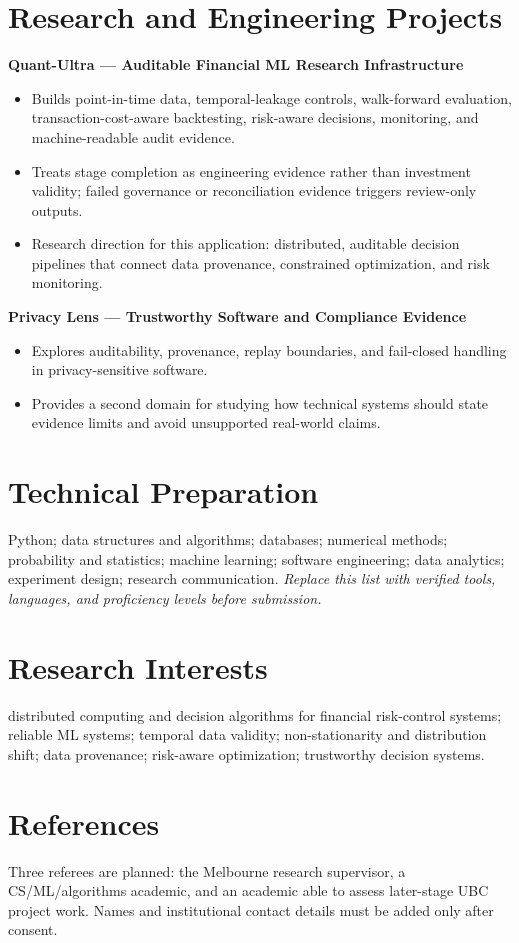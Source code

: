 \documentclass[11pt]{article}
\begin{document}
\section*{Research and Engineering Projects}
\textbf{Quant-Ultra --- Auditable Financial ML Research Infrastructure}
\begin{itemize}
\item Builds point-in-time data, temporal-leakage controls, walk-forward evaluation, transaction-cost-aware backtesting, risk-aware decisions, monitoring, and machine-readable audit evidence.
\item Treats stage completion as engineering evidence rather than investment validity; failed governance or reconciliation evidence triggers review-only outputs.
\item Research direction for this application: distributed, auditable decision pipelines that connect data provenance, constrained optimization, and risk monitoring.
\end{itemize}

\textbf{Privacy Lens --- Trustworthy Software and Compliance Evidence}
\begin{itemize}
\item Explores auditability, provenance, replay boundaries, and fail-closed handling in privacy-sensitive software.
\item Provides a second domain for studying how technical systems should state evidence limits and avoid unsupported real-world claims.
\end{itemize}

\section*{Technical Preparation}
Python; data structures and algorithms; databases; numerical methods; probability and statistics; machine learning; software engineering; data analytics; experiment design; research communication. \textit{Replace this list with verified tools, languages, and proficiency levels before submission.}

\section*{Research Interests}
distributed computing and decision algorithms for financial risk-control systems; reliable ML systems; temporal data validity; non-stationarity and distribution shift; data provenance; risk-aware optimization; trustworthy decision systems.

\section*{References}
Three referees are planned: the Melbourne research supervisor, a CS/ML/algorithms academic, and an academic able to assess later-stage UBC project work. Names and institutional contact details must be added only after consent.
\end{document}
